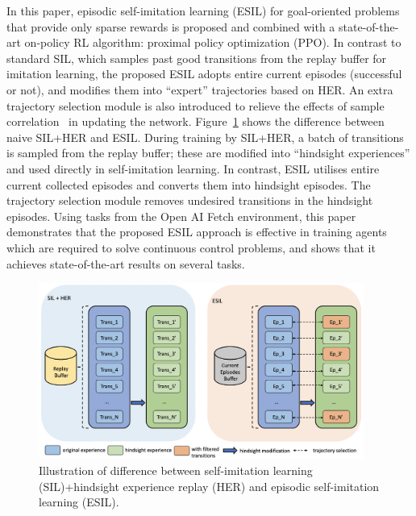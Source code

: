 In this paper, {episodic self-imitation learning (ESIL) for goal-oriented problems that provide only sparse rewards is proposed and combined with a state-of-the-art on-policy RL algorithm}: proximal policy optimization (PPO). In contrast to standard SIL, which samples past good transitions from the replay buffer for imitation learning, {the proposed} ESIL adopts entire current episodes {(successful or not)}, and modifies them into ``expert'' trajectories based on HER. An extra trajectory selection module is also introduced to relieve the effects of sample correlation~\cite{lee2019sample} in updating the network. Figure~\ref{fig:esil} shows the difference between naive SIL+HER and ESIL. During training by SIL+HER, a batch of transitions is sampled from the replay buffer; these are modified into ``hindsight experiences'' and used directly in self-imitation learning. In contrast, ESIL utilises entire current collected episodes and converts them into hindsight episodes. The trajectory selection module removes undesired transitions in the hindsight episodes. Using tasks from the Open AI Fetch environment, this paper demonstrates that the proposed ESIL approach is effective in training agents which are required to solve continuous control problems, and shows that it achieves state-of-the-art results on several tasks.

\begin{figure}[t]
\centering
\includegraphics[width=0.95\textwidth]{figures/chapter3/buffer.png}
\caption{Illustration of difference between self-imitation learning (SIL)+hindsight experience replay (HER) and episodic self-imitation learning (ESIL).}
\label{fig:esil}
\end{figure}

